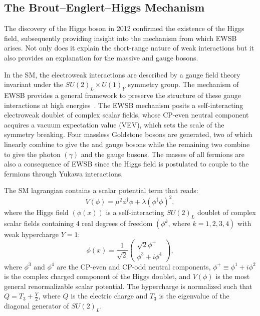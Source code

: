 \subsection{The Brout--Englert--Higgs Mechanism}
\label{sec:higgs_mech}
The discovery of the Higgs boson in 2012 confirmed the existence of the Higgs field, subsequently providing insight into the mechanism from which EWSB arises.
Not only does it explain the short-range nature of weak interactions but it also provides an explanation for the massive \PWpm and \PZ gauge bosons.

In the SM, the electroweak interactions are described by a gauge field theory invariant under the $SU(2)_L \times U(1)_Y$ symmetry group.
The mechanism of EWSB provides a general framework to preserve the structure of these gauge interactions at high energies~\cite{PhysRevD.2.1285, PhysRevLett.13.321, PhysRev.145.1156}.
The EWSB mechanism posits a self-interacting electroweak doublet of complex scalar fields, whose CP-even neutral component acquires a vacuum expectation value (VEV), which sets the scale of the symmetry breaking.
Four massless Goldstone bosons are generated, two of which linearly combine to give the \PWp and \PWm gauge bosons while the remaining two combine to give the photon $(\gamma)$ and the \PZ gauge bosons.
The masses of all fermions are also a consequence of EWSB since the Higgs field is postulated to couple to the fermions through Yukawa interactions.

The SM lagrangian contains a scalar potential term that reads:
\begin{equation}
    V (\phi) = \mu^2\phi^\dagger\phi + \lambda(\phi^\dagger\phi)^2,
    \label{eqn:scalar_pot}
\end{equation}
where the Higgs field $\left( \phi(x) \right)$ is a self-interacting $SU(2)_L$ doublet of complex scalar fields containing 4 real degrees of freedom $\left( \phi^k \text{, where } k=1, 2, 3, 4 \right)$ with weak hypercharge $Y = 1$:
\begin{equation}
    \phi(x) = \frac{1}{\sqrt{2}}
    \begin{pmatrix}
        \sqrt{2}\phi^+ \\
        \phi^3 + i\phi^4
    \end{pmatrix},
    \label{eqn:higgs_doublet}
\end{equation}
where $\phi^3$ and $\phi^4$ are the CP-even and CP-odd neutral components, $\phi^+ \equiv \phi^1 + i \phi^2$ is the complex charged component of the Higgs doublet, and $V(\phi)$ is the most general renormalizable scalar potential.
The hypercharge is normalized such that $Q = T_{3} + \frac{Y}{2}$, where $Q$ is the electric charge and $T_{3}$ is the eigenvalue of the diagonal generator of $SU(2)_L$.

